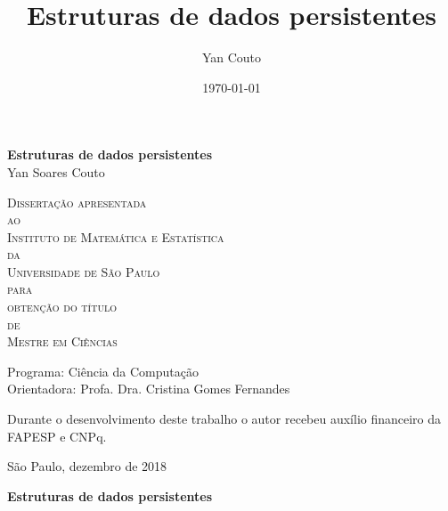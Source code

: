 \documentclass[11pt,oneside,a4paper, openany]{book}
\title{Estruturas de dados persistentes}
\author{Yan Couto}
\date{\today}
\begin{document}
\frontmatter

\thispagestyle{empty}
\begin{center}
    \vspace*{2.3cm}
    \textbf{\Large{Estruturas de dados persistentes}}\\

    \vspace*{1.2cm}
    \Large{Yan Soares Couto}

    \vskip 2cm
    \textsc{
    Dissertação apresentada\\[-0.25cm] 
    ao\\[-0.25cm]
    Instituto de Matemática e Estatística\\[-0.25cm]
    da\\[-0.25cm]
    Universidade de São Paulo\\[-0.25cm]
    para\\[-0.25cm]
    obtenção do título\\[-0.25cm]
    de\\[-0.25cm]
    Mestre em Ciências}

    \vskip 1.5cm
    Programa: Ciência da Computação\\
    Orientadora: Profa. Dra. Cristina Gomes Fernandes

    \vskip 1cm
    \normalsize{Durante o desenvolvimento deste trabalho o autor recebeu auxílio
    financeiro da FAPESP e CNPq.}

    \vskip 0.5cm
    \normalsize{São Paulo, dezembro de 2018}
\end{center}

%
%
%
\newpage
\thispagestyle{empty}
    \begin{center}
        \vspace*{2.3 cm}
        \textbf{\Large{Estruturas de dados persistentes}}\\
        \vspace*{2 cm}
    \end{center}
\end{document}
